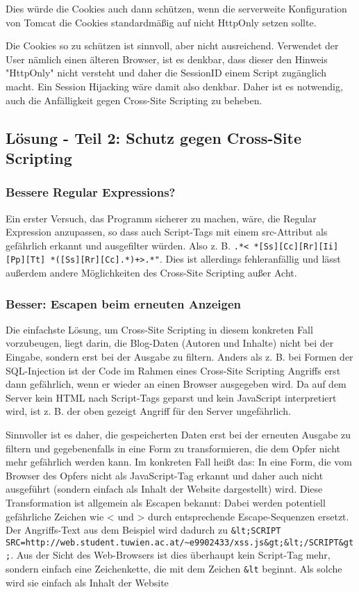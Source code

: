 Dies würde die Cookies auch dann schützen, wenn die serverweite Konfiguration von Tomcat die Cookies standardmäßig auf nicht HttpOnly setzen sollte.

Die Cookies so zu schützen ist sinnvoll, aber nicht ausreichend. Verwendet der User nämlich einen älteren Browser, ist es denkbar, dass dieser den Hinweis "HttpOnly" nicht versteht und daher die SessionID einem Script zugänglich macht. Ein Session Hijacking wäre damit also denkbar. Daher ist es notwendig, auch die Anfälligkeit gegen Cross-Site Scripting zu beheben.

\subsection{Lösung - Teil 2: Schutz gegen Cross-Site Scripting}

\subsubsection{Bessere Regular Expressions?}

Ein erster Versuch, das Programm sicherer zu machen, wäre, die Regular Expression anzupassen, so dass auch Script-Tags mit einem src-Attribut als gefährlich erkannt und ausgefilter würden. Also z. B. \lstinline$.*< *[Ss][Cc][Rr][Ii][Pp][Tt] *([Ss][Rr][Cc].*)+>.*"$. Dies ist allerdings fehleranfällig und lässt außerdem andere Möglichkeiten des Cross-Site Scripting außer Acht.

\subsubsection{Besser: Escapen beim erneuten Anzeigen}

Die einfachste Lösung, um Cross-Site Scripting in diesem konkreten Fall vorzubeugen, liegt darin, die Blog-Daten (Autoren und Inhalte) nicht bei der Eingabe, sondern erst bei der Ausgabe zu filtern. Anders als z. B. bei Formen der SQL-Injection ist der Code im Rahmen eines Cross-Site Scripting Angriffs erst dann gefährlich, wenn er wieder an einen Browser ausgegeben wird. Da auf dem Server kein HTML nach Script-Tags geparst und kein JavaScript interpretiert wird, ist z. B. der oben gezeigt Angriff für den Server ungefährlich.

Sinnvoller ist es daher, die gespeicherten Daten erst bei der erneuten Ausgabe zu filtern und gegebenenfalls in eine Form zu transformieren, die dem Opfer nicht mehr gefährlich werden kann. Im konkreten Fall heißt das: In eine Form, die vom Browser des Opfers nicht als JavaScript-Tag erkannt und daher auch nicht ausgeführt (sondern einfach als Inhalt der Website dargestellt) wird. Diese Transformation ist allgemein als Escapen bekannt: Dabei werden potentiell gefährliche Zeichen wie < und > durch entsprechende Escape-Sequenzen ersetzt. Der Angriffs-Text aus dem Beispiel wird dadurch zu \lstinline$&lt;SCRIPT SRC=http://web.student.tuwien.ac.at/~e9902433/xss.js&gt;&lt;/SCRIPT&gt;$. Aus der Sicht des Web-Browsers ist dies überhaupt kein Script-Tag mehr, sondern einfach eine Zeichenkette, die mit dem Zeichen \lstinline$&lt$ beginnt. Als solche wird sie einfach als Inhalt der Website 

